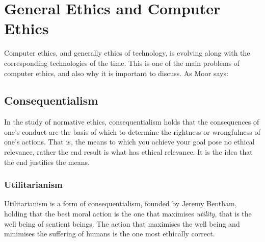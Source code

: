 \chapter{General Ethics and Computer Ethics}
Computer ethics, and generally ethics of technology, is evolving along with the corresponding technologies of the time. This is one of the main problems of computer ethics, and also why it is important to discuss. As Moor says:



\section{Consequentialism}
In the study of normative ethics, consequentialism holds that the consequences of one's conduct are the basis of which to determine the rightness or wrongfulness of one's actions. That is, the means to which you achieve your goal pose no ethical relevance, rather the end result is what has ethical relevance. It is the idea that the end justifies the means. \cite{mizzoni2009ethics}


\subsection{Utilitarianism}
Utilitarianism is a form of consequentialism, founded by Jeremy Bentham, holding that the best moral action is the one that maximises \textit{utility}, that is the well being of sentient beings. The action that maximises the well being and minimises the suffering of humans is the one most ethically correct.
